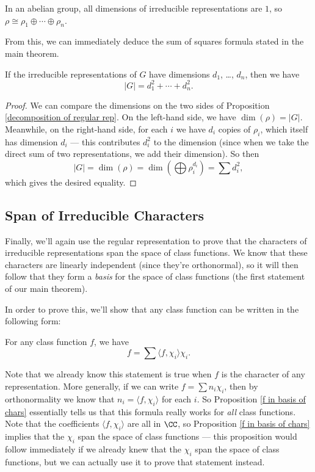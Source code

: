 \begin{example}
In an abelian group, all dimensions of irreducible representations are $1$, so $\rho \cong \rho_1 \oplus \cdots \oplus \rho_n$.
\end{example}

From this, we can immediately deduce the sum of squares formula stated in the main theorem.  

\begin{proposition}
    If the irreducible representations of $G$ have dimensions $d_1$, \ldots, $d_n$, then we have \[\lvert G \rvert = d_1^2 + \cdots + d_n^2.\] 
\end{proposition}

\begin{proof}
    We can compare the dimensions on the two sides of Proposition \ref{decomposition of regular rep}. On the left-hand side, we have $\dim(\rho) = \lvert G \rvert$. Meanwhile, on the right-hand side, for each $i$ we have $d_i$ copies of $\rho_i$, which itself has dimension $d_i$ --- this contributes $d_i^2$ to the dimension (since when we take the direct sum of two representations, we add their dimension). So then \[|G| = \dim(\rho) = \dim\left(\bigoplus \rho_i^{d_i}\right) = \sum d_i^2,\] which gives the desired equality. 
\end{proof}

\subsection{Span of Irreducible Characters}

Finally, we'll again use the regular representation to prove that the characters of irreducible representations span the space of class functions. We know that these characters are linearly independent (since they're orthonormal), so it will then follow that they form a \emph{basis} for the space of class functions (the first statement of our main theorem). 

In order to prove this, we'll show that any class function can be written in the following form:

\begin{proposition} \label{f in basis of chars}
For any class function $f$, we have \[f = \sum \langle f, \chi_i \rangle \chi_i.\] 
\end{proposition}

Note that we already know this statement is true when $f$ is the character of any representation. More generally, if we can write $f = \sum n_i\chi_i$, then by orthonormality we know that $n_i = \langle f, \chi_i \rangle$ for each $i$. So Proposition \ref{f in basis of chars} essentially tells us that this formula really works for \emph{all} class functions. Note that the coefficients $\langle f, \chi_i \rangle$ are all in $\CC$, so Proposition \ref{f in basis of chars} implies that the $\chi_i$ span the space of class functions --- this proposition would follow immediately if we already knew that the $\chi_i$ span the space of class functions, but we can actually use it to prove that statement instead. 

